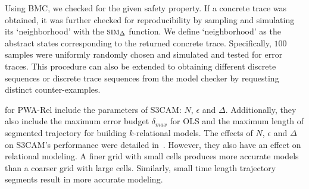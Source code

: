 

Using BMC, we checked for the given safety property. If a concrete
trace was obtained, it was further checked for reproducibility by
sampling and simulating its `neighborhood' with the $\mbox{\sc sim}_\Delta$
function. We define `neighborhood' as the abstract states
corresponding to the returned concrete trace.  Specifically, $100$
samples were uniformly randomly chosen and simulated and tested for
error traces. This procedure can also be extended to obtaining
different discrete sequences or discrete trace sequences from the
model checker by requesting distinct counter-examples.


 for PWA-Rel include the parameters of
S3CAM: $N$, $\epsilon$ and $\Delta$. Additionally, they also include
the maximum error budget $\delta_{max}$ for OLS and the maximum length
of segmented trajectory for building $k$-relational models.  The
effects of $N$, $\epsilon$ and $\Delta$ on S3CAM's performance were
detailed in~\cite{zutshi2014multiple}. However, they also have an
effect on relational modeling. A finer grid with small cells produces
more accurate models than a coarser grid with large cells. Similarly,
small time length trajectory segments result in more accurate
modeling.




